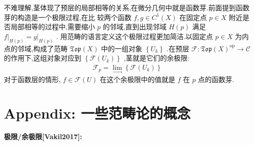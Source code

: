 不难理解,茎体现了预层的局部相等的关系,在微分几何中就是函数芽.前面提到函数芽的构造是一个极限过程,在比 较两个函数 $f, g \in C^1(X)$ 在固定点 $p \in X$ 附近是否局部相等的过程中,需要缩小 $p$ 的邻域,直到出现邻域 $H(p)$ 满足 $\left.f\right|_{H(p)}=\left.g\right|_{H(p)}$ .
用范畴的语言定义这个极限过程更加简洁.以固定点 $p \in X$ 为内点的邻域,构成了范畴 $\mathfrak{T} \mathfrak{o p}(X)$ 中的一组对象 $\left\{U_k\right\}$ .在预层 $\mathscr{F}: \mathfrak{T o p}(X)^{\mathrm{op}} \rightarrow \mathcal{C}$ 的作用下,这组对象对应到 $\left\{\mathscr{F}\left(U_k\right)\right\}$ ,茎就是它们的余极限:
\begin{align*}
\mathscr{F}_p=\lim _{\longrightarrow}\left\{\mathscr{F}\left(U_k\right)\right\}
\end{align*}
对于函数层的情形, $f \in \mathscr{F}(U)$ 在这个余极限中的值就是 $f$ 在 $p$ 点的函数芽.
\section{Appendix: 一些范畴论的概念}
\textbf{极限/余极限[Vakil2017]:}

